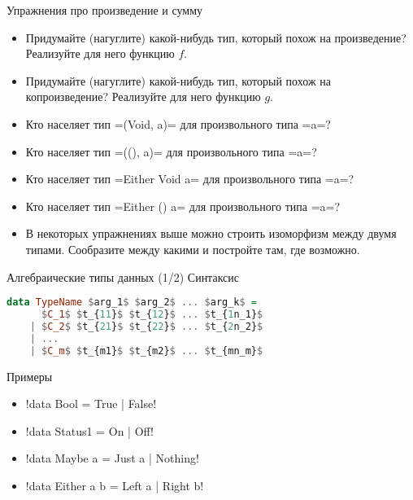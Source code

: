 \documentclass{beamer}
\begin{document}
\begin{frame}[fragile]{Упражнения про произведение и сумму}
\begin{itemize}
 \item Придумайте (нагуглите) какой-нибудь тип, который похож на произведение? Реализуйте для него функцию $f$.
 \item Придумайте (нагуглите) какой-нибудь тип, который похож на копроизведение? Реализуйте для него функцию $g$.
 \item Кто населяет тип \hsinline=(Void, a)= для произвольного типа \hsinline=a=?
 \item Кто населяет тип \hsinline=((), a)= для произвольного типа \hsinline=a=?
 \item Кто населяет тип \hsinline=Either Void a= для произвольного типа \hsinline=a=?
 \item Кто населяет тип \myinline=Either ()   a= для произвольного типа \hsinline=a=?
 \item В некоторых упражнениях выше можно строить изоморфизм между двумя типами. Сообразите между какими и постройте там, где возможно.
\end{itemize}

\end{frame}

\begin{frame}[fragile]{Алгебраические типы данных (1/2)}
Синтаксис
 \begin{lstlisting}[mathescape=true,language=haskell]
  data TypeName $arg_1$ $arg_2$ ... $arg_k$ = 
      $C_1$ $t_{11}$ $t_{12}$ ... $t_{1n_1}$ 
    | $C_2$ $t_{21}$ $t_{22}$ ... $t_{2n_2}$ 
    | ...
    | $C_m$ $t_{m1}$ $t_{m2}$ ... $t_{mn_m}$ 
 \end{lstlisting}
 Примеры
 \begin{itemize}
  \item \hsinline!data Bool    = True | False!
  \item \hsinline!data Status1 = On   | Off!
  \item \hsinline!data Maybe a = Just a | Nothing!
  \item \hsinline!data Either a b = Left a | Right b!
 \end{itemize}
\end{frame}
\end{document}

